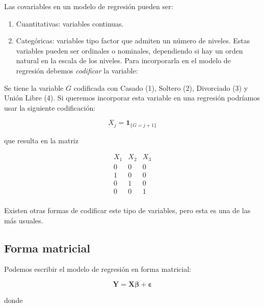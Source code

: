 \documentclass[
  12pt,
]{book}
\providecommand{\tightlist}{%
  \setlength{\itemsep}{0pt}\setlength{\parskip}{0pt}}
\begin{document}
Las covariables en un modelo de regresión pueden ser:

\begin{enumerate}
\def\labelenumi{\arabic{enumi}.}
\tightlist
\item
  Cuantitativas: variables continuas.
\item
  Categóricas: variables tipo factor que admiten un número de niveles.
  Estas variables pueden ser ordinales o nominales, dependiendo si hay
  un orden natural en la escala de los niveles. Para incorporarla en el
  modelo de regresión debemos \emph{codificar} la variable:
\end{enumerate}

\leavevmode{}%
Se tiene la variable \(G\) codificada con Casado (1), Soltero (2),
Divorciado (3) y Unión Libre (4). Si queremos incorporar esta variable
en una regresión podríamos usar la siguiente codificación:

\begin{equation*}
X_{j} = \mathbf{1}_{\{G=j+1\}} 
\end{equation*}

que resulta en la matriz

\begin{equation*}
\begin{matrix}
X_{1} & X_{2} & X_{3}\\
0 & 0 & 0 \\
1 & 0 & 0 \\
0 & 1 & 0 \\
0 & 0 & 1 \\
\end{matrix}
\end{equation*}

Existen otras formas de codificar este tipo de variables, pero esta es
una de las más usuales.

\hypertarget{forma-matricial}{%
\subsection{Forma matricial}\label{forma-matricial}}

Podemos escribir el modelo de regresión en forma matricial:

\begin{equation*}
\boldsymbol{Y} = \boldsymbol{X}\boldsymbol{\beta} + \boldsymbol{\varepsilon}
\end{equation*}

donde
\end{document}
